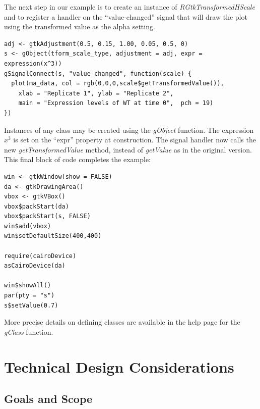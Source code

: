 \documentclass[article]{jss}
\begin{document}
The next step in our example is to create an instance
of \emph{RGtkTransformedHScale} and to register a handler on the 
``value-changed'' signal that will draw the plot using the transformed
value as 
the alpha setting.
\begin{verbatim}
adj <- gtkAdjustment(0.5, 0.15, 1.00, 0.05, 0.5, 0)
s <- gObject(tform_scale_type, adjustment = adj, expr =
expression(x^3))
gSignalConnect(s, "value-changed", function(scale) {
  plot(ma_data, col = rgb(0,0,0,scale$getTransformedValue()),
    xlab = "Replicate 1", ylab = "Replicate 2", 
    main = "Expression levels of WT at time 0",  pch = 19)
})
\end{verbatim}
Instances of any  class may be created using the
\emph{gObject} function.
The expression $x^3$ is set on the ``expr'' property at construction.
The
signal handler now calls the new \emph{getTransformedValue} method,
instead
of \emph{getValue} as in the original version. This final block of
code
completes the example:
\begin{verbatim}
win <- gtkWindow(show = FALSE)
da <- gtkDrawingArea()
vbox <- gtkVBox()
vbox$packStart(da)
vbox$packStart(s, FALSE)
win$add(vbox)
win$setDefaultSize(400,400)

require(cairoDevice)
asCairoDevice(da)

win$showAll()
par(pty = "s")
s$setValue(0.7)
\end{verbatim}

More precise details on defining  classes are available
in the 
 help page for the \emph{gClass} function.

\section{Technical Design Considerations}

\subsection{Goals and Scope}
\end{document}
